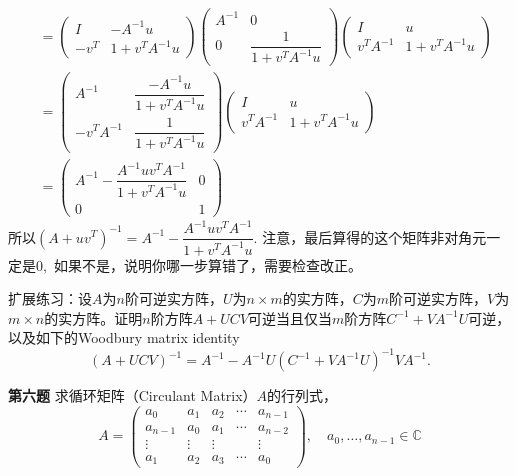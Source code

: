 \begin{align*}
& = \begin{pmatrix} I & -A^{-1}u \\ -v^T & 1 + v^TA^{-1}u \end{pmatrix} \begin{pmatrix} A^{-1} & 0 \\ 0 & \dfrac{1}{1 + v^TA^{-1}u} \end{pmatrix} \begin{pmatrix} I & u \\ v^TA^{-1} & 1 + v^TA^{-1}u \end{pmatrix} \\
& = \begin{pmatrix} A^{-1} & \dfrac{-A^{-1}u}{1 + v^TA^{-1}u} \\ -v^T A^{-1} & \dfrac{1}{1 + v^TA^{-1}u} \end{pmatrix} \begin{pmatrix} I & u \\ v^TA^{-1} & 1 + v^TA^{-1}u \end{pmatrix} \\
& = \begin{pmatrix} A^{-1} - \dfrac{ A^{-1}uv^TA^{-1}}{1 + v^TA^{-1}u} & 0 \\ 0 & 1 \end{pmatrix}
\end{align*}
所以$(A + uv^T)^{-1} = A^{-1} - \dfrac{ A^{-1}uv^TA^{-1}}{1 + v^TA^{-1}u}.$ 注意，最后算得的这个矩阵非对角元一定是$0,$ 如果不是，说明你哪一步算错了，需要检查改正。

\vspace{2em}

扩展练习：设$A$为$n$阶可逆实方阵，$U$为$n\times m$的实方阵，$C$为$m$阶可逆实方阵，$V$为$m\times n$的实方阵。证明$n$阶方阵$A + UCV$可逆当且仅当$m$阶方阵$C^{-1} + VA^{-1}U$可逆，以及如下的Woodbury matrix identity
$$\left( A + UCV \right)^{-1} = A^{-1} - A^{-1} U \left( C^{-1} + VA^{-1}U \right)^{-1} V A^{-1}.$$

\fi  %

\newpageorvspace

{\bf 第六题} 求循环矩阵（Circulant Matrix）$A$的行列式，
$$A = \begin{pmatrix} a_0 & a_1 & a_2 & \cdots & a_{n-1} \\ a_{n-1} & a_0 & a_1 & \cdots & a_{n-2} \\ \vdots & \vdots & \vdots & & \vdots \\ a_1 & a_2 & a_3 & \cdots & a_0 \end{pmatrix}, \quad a_0,\ldots,a_{n-1} \in \mathbb{C}$$

